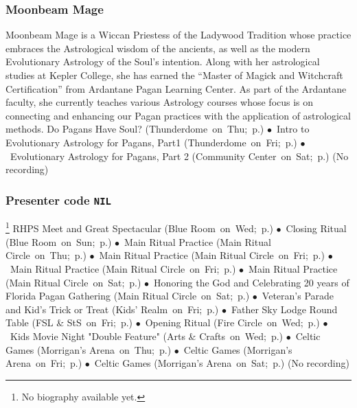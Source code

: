 \vspace{6pt}

\subsubsection{Moonbeam Mage} %
{  \small  Moonbeam Mage is a Wiccan Priestess of the Ladywood Tradition whose practice embraces the Astrological wisdom of the ancients, as well as the modern Evolutionary Astrology of the Soul's intention. Along with her astrological studies at Kepler College, she has earned the  ``Master of Magick and Witchcraft Certification''  from Ardantane Pagan Learning Center.  As part of the Ardantane faculty, she currently teaches various Astrology courses whose focus is on connecting and enhancing our Pagan practices with the application of astrological methods. } %
\hspace{2em} {\footnotesize Do Pagans Have Soul? (Thunderdome~on~Thu;~p.\pageref{Thu-Mage1}) $\bullet$~Intro to Evolutionary Astrology for Pagans, Part1 (Thunderdome~on~Fri;~p.\pageref{Fri-Mage2}) $\bullet$~Evolutionary Astrology for Pagans, Part 2 (Community Center~on~Sat;~p.\pageref{Sat-Mage3})}
 {\small (No recording)} 

\vspace{6pt}

\subsubsection{\textbf{Presenter code \texttt{NIL}}} %
{  \small  \footnote{No biography available yet.} } %
\hspace{2em} {\footnotesize RHPS Meet and Great Spectacular (Blue Room~on~Wed;~p.\pageref{Wed-Meet-Greet}) $\bullet$~Closing Ritual (Blue Room~on~Sun;~p.\pageref{Sun-CLOSING}) $\bullet$~Main Ritual Practice (Main Ritual Circle~on~Thu;~p.\pageref{Thu-Prac1}) $\bullet$~Main Ritual Practice (Main Ritual Circle~on~Fri;~p.\pageref{Fri-Prac2}) $\bullet$~Main Ritual Practice (Main Ritual Circle~on~Fri;~p.\pageref{Fri-Prac3}) $\bullet$~Main Ritual Practice (Main Ritual Circle~on~Sat;~p.\pageref{Sat-Prac4}) $\bullet$~Honoring the God and Celebrating 20 years of Florida Pagan Gathering (Main Ritual Circle~on~Sat;~p.\pageref{Sat-RITUAL}) $\bullet$~Veteran's Parade and Kid's Trick or Treat (Kids' Realm~on~Fri;~p.\pageref{Fri-Parade}) $\bullet$~Father Sky Lodge Round Table (FSL \& StS~on~Fri;~p.\pageref{Fri-Sage1}) $\bullet$~Opening Ritual (Fire Circle~on~Wed;~p.\pageref{Wed-OPENING}) $\bullet$~Kids Movie Night "Double Feature" (Arts \& Crafts~on~Wed;~p.\pageref{Wed-kid-Meet}) $\bullet$~Celtic Games (Morrigan's Arena~on~Thu;~p.\pageref{Thu-Celts1}) $\bullet$~Celtic Games (Morrigan's Arena~on~Fri;~p.\pageref{Fri-Celts2}) $\bullet$~Celtic Games (Morrigan's Arena~on~Sat;~p.\pageref{Sat-Celts3})}
 {\small (No recording)} 

